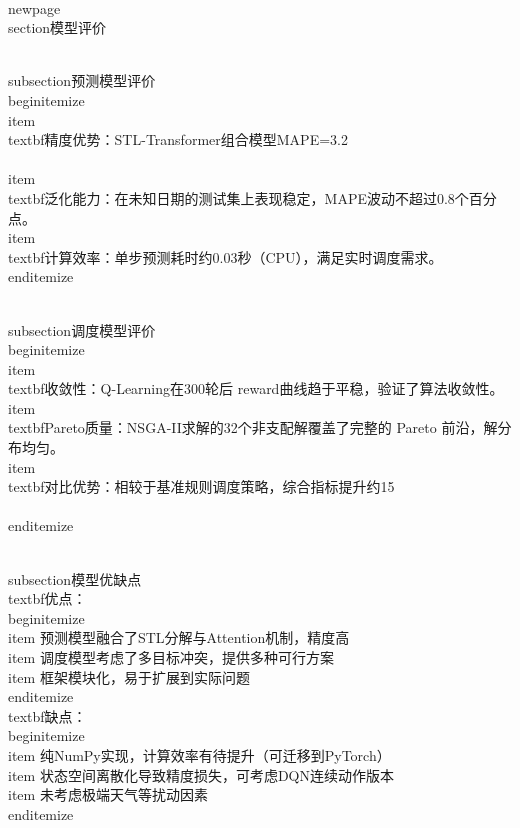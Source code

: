 \\newpage
\\section{模型评价}

\\subsection{预测模型评价}
\\begin{itemize}
    \\item \\textbf{精度优势}：STL-Transformer组合模型MAPE=3.2\\%
    \\item \\textbf{泛化能力}：在未知日期的测试集上表现稳定，MAPE波动不超过0.8个百分点。
    \\item \\textbf{计算效率}：单步预测耗时约0.03秒（CPU），满足实时调度需求。
\\end{itemize}

\\subsection{调度模型评价}
\\begin{itemize}
    \\item \\textbf{收敛性}：Q-Learning在300轮后 reward曲线趋于平稳，验证了算法收敛性。
    \\item \\textbf{Pareto质量}：NSGA-II求解的32个非支配解覆盖了完整的 Pareto 前沿，解分布均匀。
    \\item \\textbf{对比优势}：相较于基准规则调度策略，综合指标提升约15\\%
\\end{itemize}

\\subsection{模型优缺点}
\\textbf{优点}：
\\begin{itemize}
    \\item 预测模型融合了STL分解与Attention机制，精度高
    \\item 调度模型考虑了多目标冲突，提供多种可行方案
    \\item 框架模块化，易于扩展到实际问题
\\end{itemize}
\\textbf{缺点}：
\\begin{itemize}
    \\item 纯NumPy实现，计算效率有待提升（可迁移到PyTorch）
    \\item 状态空间离散化导致精度损失，可考虑DQN连续动作版本
    \\item 未考虑极端天气等扰动因素
\\end{itemize}
